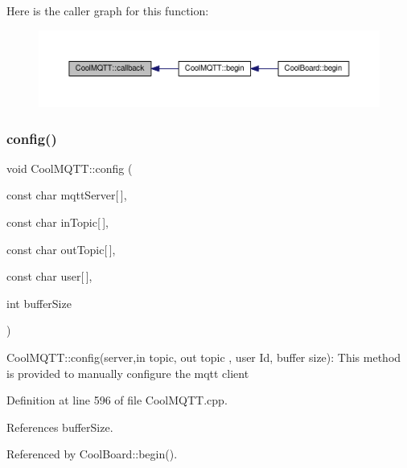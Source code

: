 Here is the caller graph for this function\+:
\nopagebreak
\begin{figure}[H]
\begin{center}
\leavevmode
\includegraphics[width=350pt]{classCoolMQTT_a30d82ad665bfb603f46ecdbc290775df_icgraph}
\end{center}
\end{figure}
\mbox{\label{classCoolMQTT_a9b703de4f1358f0ee7a5e8c44979c648}} 
\subsubsection{\texorpdfstring{config()}{config()}\hspace{0.1cm}{\footnotesize\ttfamily [1/2]}}
{\footnotesize\ttfamily void Cool\+M\+Q\+T\+T\+::config (\begin{DoxyParamCaption}\item[{const char}]{mqtt\+Server\mbox{[}$\,$\mbox{]},  }\item[{const char}]{in\+Topic\mbox{[}$\,$\mbox{]},  }\item[{const char}]{out\+Topic\mbox{[}$\,$\mbox{]},  }\item[{const char}]{user\mbox{[}$\,$\mbox{]},  }\item[{int}]{buffer\+Size }\end{DoxyParamCaption})}

Cool\+M\+Q\+T\+T\+::config(server,in topic, out topic , user Id, buffer size)\+: This method is provided to manually configure the mqtt client 

Definition at line 596 of file Cool\+M\+Q\+T\+T.\+cpp.



References buffer\+Size.



Referenced by Cool\+Board\+::begin().



